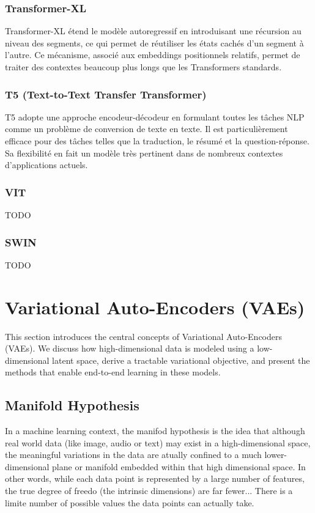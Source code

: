 \documentclass{article}
\begin{document}
\subsubsection{Transformer-XL}
Transformer-XL étend le modèle autoregressif en introduisant une récursion au niveau des segments, ce qui permet de réutiliser les états cachés d’un segment à l’autre. Ce mécanisme, associé aux embeddings positionnels relatifs, permet de traiter des contextes beaucoup plus longs que les Transformers standards.

\subsubsection{T5 (Text-to-Text Transfer Transformer)}
T5 adopte une approche encodeur-décodeur en formulant toutes les tâches NLP comme un problème de conversion de texte en texte. Il est particulièrement efficace pour des tâches telles que la traduction, le résumé et la question-réponse. Sa flexibilité en fait un modèle très pertinent dans de nombreux contextes d'applications actuels.

\subsubsection{VIT}
TODO

\subsubsection{SWIN}
TODO

\clearpage\newpage

\section{Variational Auto-Encoders (VAEs)}
This section introduces the central concepts of Variational Auto-Encoders (VAEs). We discuss how high-dimensional data is modeled using a low-dimensional latent space, derive a tractable variational objective, and present the methods that enable end-to-end learning in these models.

\subsection{Manifold Hypothesis}
In a machine learning context, the manifod hypothesis is the idea that although real world data (like image, audio or text) may exist in a high-dimensional space, the meaningful variations in the data are atually confined to a much lower-dimensional plane or manifold embedded within that high dimensional space. In other words, while each data point is represented by a large number of features, the true degree of freedo (the intrinsic dimensions) are far fewer... There is a limite number of possible values the data points can actually take.
\end{document}
